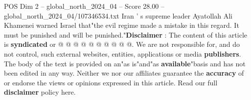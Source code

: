 \begin{textsample}{POS Dim 2 – global\_north\_2024\_04 – Score 28.00 – global\_north\_2024\_04/107346534.txt}
Iran ' s supreme leader Ayatollah Ali Khamenei warned Israel that"the evil regime made a mistake in this regard.
It must be punished and will be punished."\textbf{Disclaimer} : The content of this article is \textbf{syndicated} or @ @ @ @ @ @ @ @ @ @.
We are not responsible for, and do not control, such external websites, entities, applications or media \textbf{publishers}.
The body of the text is provided on an"as is"and"as \textbf{available}"basis and has not been edited in any way.
Neither we nor our affiliates guarantee the \textbf{accuracy} of or endorse the views or opinions expressed in this article.
Read our full \textbf{disclaimer} policy here.

\end{textsample}
